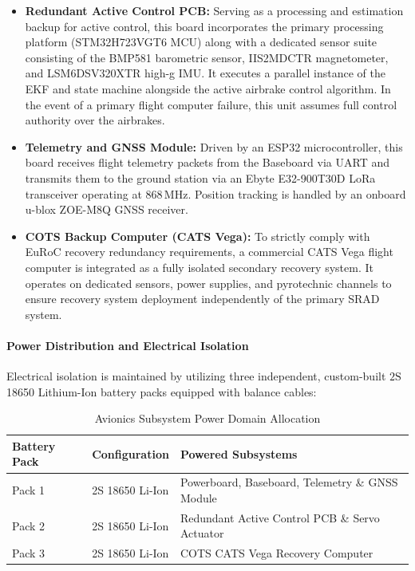 \documentclass[11pt, a4paper]{article} %
\begin{document}
\begin{itemize}
    \item \textbf{Redundant Active Control PCB:} Serving as a processing and estimation backup for active control, this board incorporates the primary processing platform (STM32H723VGT6 MCU) along with a dedicated sensor suite consisting of the BMP581 barometric sensor, IIS2MDCTR magnetometer, and LSM6DSV320XTR high-g IMU. It executes a parallel instance of the EKF and state machine alongside the active airbrake control algorithm. In the event of a primary flight computer failure, this unit assumes full control authority over the airbrakes.

    \item \textbf{Telemetry and GNSS Module:} Driven by an ESP32 microcontroller, this board receives flight telemetry packets from the Baseboard via UART and transmits them to the ground station via an Ebyte E32-900T30D LoRa transceiver operating at $868\,\text{MHz}$. Position tracking is handled by an onboard u-blox ZOE-M8Q GNSS receiver.

    \item \textbf{COTS Backup Computer (CATS Vega):} To strictly comply with EuRoC recovery redundancy requirements, a commercial CATS Vega flight computer is integrated as a fully isolated secondary recovery system. It operates on dedicated sensors, power supplies, and pyrotechnic channels to ensure recovery system deployment independently of the primary SRAD system.
\end{itemize}

\paragraph{Power Distribution and Electrical Isolation}
Electrical isolation is maintained by utilizing three independent, custom-built $2\text{S}$ 18650 Lithium-Ion battery packs equipped with balance cables:

\begin{table}[H]
\centering
\caption{Avionics Subsystem Power Domain Allocation}
\label{tab:power_domains}
\begin{tabularx}{\textwidth}{l l X}
\toprule
\textbf{Battery Pack} & \textbf{Configuration} & \textbf{Powered Subsystems} \\
\midrule
Pack 1 & 2S 18650 Li-Ion & Powerboard, Baseboard, Telemetry \& GNSS Module \\
Pack 2 & 2S 18650 Li-Ion & Redundant Active Control PCB \& Servo Actuator \\
Pack 3 & 2S 18650 Li-Ion & COTS CATS Vega Recovery Computer \\
\bottomrule
\end{tabularx}
\end{table}
\end{document}
